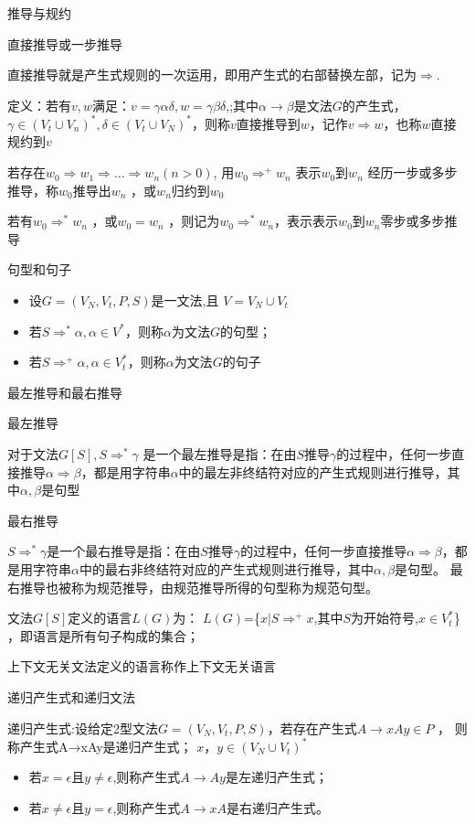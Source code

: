 \documentclass[utf8]{ctexart}
\begin{document}
\noindent 推导与规约

直接推导或一步推导

直接推导就是产生式规则的一次运用，即用产生式的右部替换左部，记为$\Rightarrow$.

定义：若有$v,w$满足：$v=\gamma \alpha \delta, w=\gamma \beta \delta$,;其中$\alpha \rightarrow \beta$是文法$G$的产生式，
$\gamma \in (V_t \cup V_n)^*, \delta \in (V_t \cup V_N)^*$，则称$v$直接推导到$w$，记作$v \Rightarrow w$，也称$w$直接规约到$v$

若存在$w_0 \Rightarrow w_1 \Rightarrow \dots  \Rightarrow w_n (n > 0)$, 
用$w_0 {\Rightarrow} ^+ w_n$ 表示$w_0$到$w_n$ 经历一步或多步推导，称$w_0$推导出$w_n$ ，或$w_n$归约到$w_0$

若有$w_0 \Rightarrow ^* w_n$ ，或$w_0 = w_n$ ，则记为$w_0 \Rightarrow ^* w_n $，表示表示$w_0$到$w_n$零步或多步推导

句型和句子
\begin{itemize}
    \item 设$G=(V_N, V_t, P, S)$是一文法,且 $V=V_N \cup V_t$
    \item 若$S \Rightarrow ^* \alpha, \alpha \in V^*$，则称$\alpha$为文法$G$的句型；
    \item 若$S \Rightarrow ^+ \alpha, \alpha \in V_t^*$，则称$\alpha$为文法$G$的句子
\end{itemize}

\noindent 最左推导和最右推导

最左推导

对于文法$G[S],S \Rightarrow ^* \gamma$ 是一个最左推导是指：在由$S$推导$γ$的过程中，任何一步直接推导$\alpha \Rightarrow \beta$，都是用字符串$\alpha$中的最左非终结符对应的产生式规则进行推导，其中$\alpha, \beta$是句型

最右推导

$S \Rightarrow ^* \gamma$是一个最右推导是指：在由$S$推导$\gamma$的过程中，任何一步直接推导$\alpha \Rightarrow \beta$，都是用字符串$\alpha$中的最右非终结符对应的产生式规则进行推导，其中$\alpha, \beta$是句型。
最右推导也被称为规范推导，由规范推导所得的句型称为规范句型。

文法$G[S]$定义的语言$L(G)$为：
$L(G)$=\{$x|S \Rightarrow ^+ x$,其中$S$为开始符号,$x \in V_t^*$\} ，即语言是所有句子构成的集合；

上下文无关文法定义的语言称作上下文无关语言

递归产生式和递归文法

递归产生式:设给定2型文法$G=(V_N, V_t, P, S)$，若存在产生式$A \rightarrow xAy \in P$ ，
则称产生式A→xAy是递归产生式； $x，y \in (V_N \cup V_t)^*$
\begin{itemize}
    \item 若$x=\epsilon$且$y\neq \epsilon$,则称产生式$A \rightarrow Ay$是左递归产生式；
    \item 若$x \neq \epsilon $且$y=\epsilon$,则称产生式$A \rightarrow xA$是右递归产生式。
\end{itemize}
\end{document}
